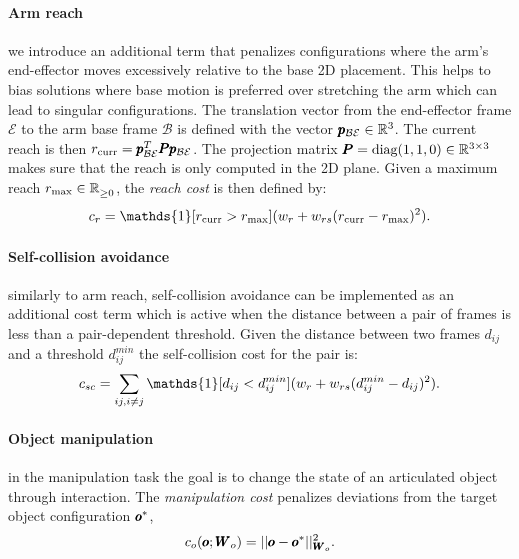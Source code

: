  \paragraph{Arm reach} we introduce an additional term that penalizes configurations where the arm's end-effector moves excessively relative to the base 2D placement. This helps to bias solutions where base motion is preferred over stretching the arm which can lead to singular configurations. The translation vector from the end-effector frame $\mathcal{E}$ to the arm base frame $\mathcal{B}$ is defined with the vector $\pmb{p}_{\mathcal{B}\mathcal{E}} \in \mathbb{R}^{3}$. The current reach is then $r_{\text{curr}} =  \pmb{p}_{\mathcal{B}\mathcal{E}}^T \pmb{P} \pmb{p}_{\mathcal{B}\mathcal{E}}$. The projection matrix $\pmb{P} = \text{diag}(1, 1, 0) \in \mathbb{R}^{3 \times 3}$ makes sure that the reach is only computed in the 2D plane. Given a maximum reach $r_{\text{max}} \in \mathbb{R}^{}_{\geq 0}$, the \textit{reach cost} is then defined by:
 \begin{equation}
   c_r = \mathds{1}[r_{\text{curr}} > r_{\text{max}}] (\weightScalar{r} + \weightScalar{rs}(r_{\text{curr}} - r_{\text{max}})^2).    
 \end{equation}

 \paragraph{Self-collision avoidance} similarly to arm reach, self-collision avoidance can be implemented as an additional cost term which is active when the distance between a pair of frames is less than a pair-dependent threshold. Given the distance between two frames $d_{ij}$ and a threshold $d^{min}_{ij}$ the self-collision cost for the pair is:
 \begin{equation}
   c_{sc} = \sum_{ij, i \neq j} \mathds{1}[d_{ij} < d^{min}_{ij}] (\weightScalar{r} + \weightScalar{rs}(d^{min}_{ij} - d_{ij})^2).    
 \end{equation}
 
 \paragraph{Object manipulation} in the manipulation task the goal is to change the state of an articulated object through interaction. The \textit{manipulation cost} penalizes deviations from the target object configuration $\pmb{o}^{*}$,
\begin{equation}
    c_o(\pmb{o}; \pmb{W}_{o}) = || \pmb{o} - \pmb{o}^{*}||^2_{\pmb{W}_{o}}.
\end{equation}

